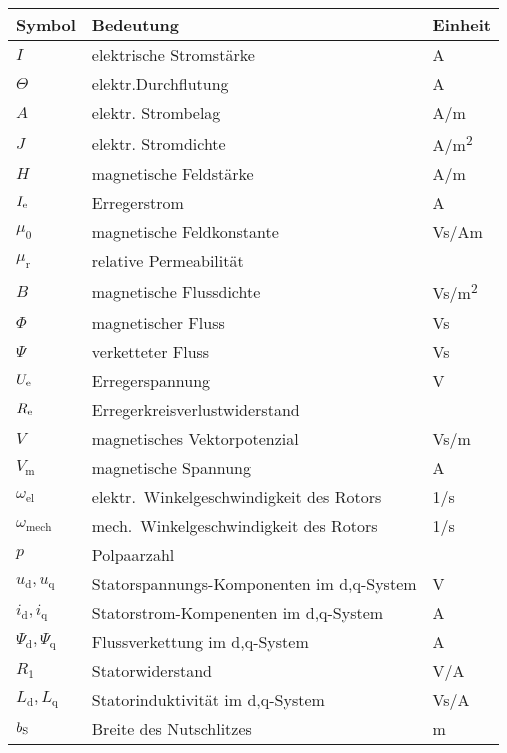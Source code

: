 \begin{flushleft}
\begin{tabularx}{\textwidth}{lll}
\toprule
Symbol & Bedeutung	& Einheit\\
\midrule
$I$	& elektrische Stromstärke	&	\si{A} \\
$\Theta$	&	elektr.Durchflutung 	&	\si{A}	\\
$A$			&	elektr. Strombelag  	&  	\si{A/m}\\ 
$J$			&	elektr. Stromdichte		&	\si{A/m^2} \\	
$H$			&	magnetische Feldstärke		&	\si{A/m}\\
$I_{\mathrm{e}}$	&	Erregerstrom	&	\si{A} \\
$\mu_\mathrm{0}$		&	magnetische Feldkonstante	&	\si{Vs/Am}\\
$\mu_\mathrm{r}$		&	relative Permeabilität		&	\\
$B$			&	magnetische Flussdichte		&	\si{Vs/m^2}\\
$\Phi$		&	magnetischer Fluss			&	\si{Vs} \\
$\Psi$		&	verketteter Fluss			&	\si{Vs} \\
$U_{\mathrm{e}}$ & Erregerspannung & \si{V}\\
$R_{\mathrm{e}}$	&	Erregerkreisverlustwiderstand &	\si{\Omega}\\
$V$			&	magnetisches Vektorpotenzial&	\si{Vs/m}\\
$V_\mathrm{m}$		&	magnetische Spannung		&	\si{A} \\
$\omega_\mathrm{el}$	&	elektr.\ Winkelgeschwindigkeit des Rotors & \si{1/s} \\
$\omega_\mathrm{mech}$	&	mech.\ Winkelgeschwindigkeit des Rotors & \si{1/s} \\
$p$		&	Polpaarzahl					&	\\
$u_\mathrm{d}, u_\mathrm{q}$	&	Statorspannungs-Komponenten im d,q-System &	\si{V} \\
$i_\mathrm{d}, i_\mathrm{q}$	&	Statorstrom-Kompenenten im d,q-System	&	\si{A} \\
$\Psi_\mathrm{d}, \Psi_\mathrm{q}$	&	Flussverkettung im d,q-System	&	\si{A} \\
$R_\mathrm{1}$		&	Statorwiderstand			&	\si{V/A} \\
$L_\mathrm{d}, L_\mathrm{q}$	& 	Statorinduktivität im d,q-System & \si{Vs/A}\\
$b_{\mathrm{S}}$	& Breite des Nutschlitzes & \si{m}\\
\bottomrule
\end{tabularx}
\end{flushleft}
